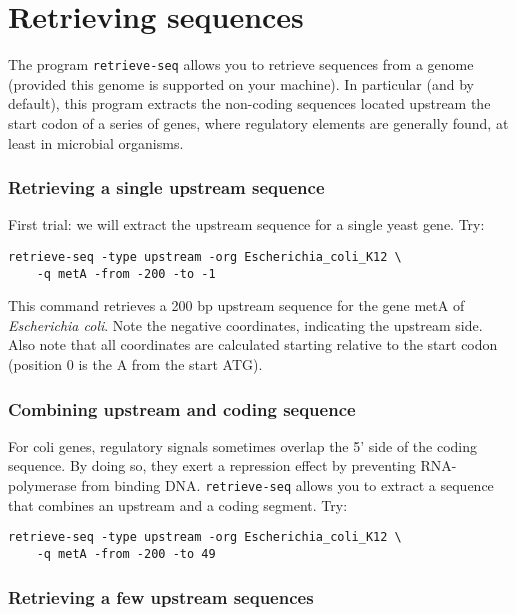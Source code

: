 \section{Retrieving sequences}

The program \texttt{retrieve-seq} allows you to retrieve sequences
from a genome (provided this genome is supported on your machine). In
particular (and by default), this program extracts the non-coding
sequences located upstream the start codon of a series of genes, where
regulatory elements are generally found, at least in microbial
organisms.

\subsubsection{Retrieving a single upstream sequence}
First trial: we will extract the upstream sequence for a single yeast
gene. Try:

\begin{verbatim}
retrieve-seq -type upstream -org Escherichia_coli_K12 \
    -q metA -from -200 -to -1
\end{verbatim}

This command retrieves a 200 bp upstream sequence for the gene metA of
\textit{Escherichia coli}. Note the negative coordinates, indicating the
upstream side. Also note that all coordinates are calculated starting
relative to the start codon (position 0 is the A from the start ATG).

\subsubsection{Combining upstream and coding sequence}
For coli genes, regulatory signals sometimes overlap the 5' side of
the coding sequence. By doing so, they exert a repression effect by
preventing RNA-polymerase from binding DNA. \texttt{retrieve-seq}
allows you to extract a sequence that combines an upstream and a
coding segment. Try:

\begin{verbatim}
retrieve-seq -type upstream -org Escherichia_coli_K12 \
    -q metA -from -200 -to 49
\end{verbatim}

\subsubsection{Retrieving a few upstream sequences}

